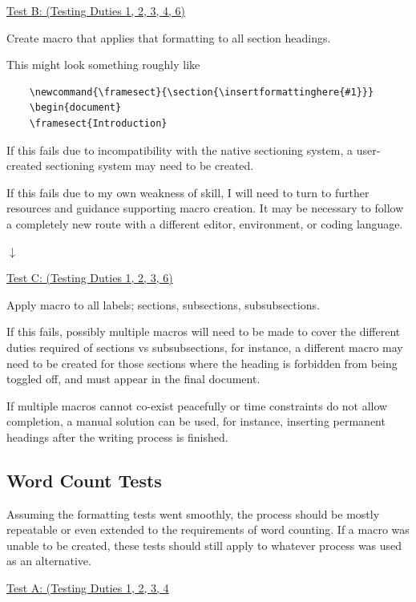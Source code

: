 \documentclass[12pt]{article}
\begin{document}
\underline{Test B: (Testing Duties 1, 2, 3, 4, 6)}

Create macro that applies that formatting to all section headings.

This might look something roughly like 
\begin{verbatim}
    \newcommand{\framesect}{\section{\insertformattinghere{#1}}}
    \begin{document}
    \framesect{Introduction}
\end{verbatim}

If this fails due to incompatibility with the native sectioning system, a user-created sectioning system may need to be created.

If this fails due to my own weakness of skill, I will need to turn to further resources and guidance supporting macro creation. It may be necessary to follow a completely new route with a different editor, environment, or coding language.

$\downarrow$

\underline{Test C: (Testing Duties 1, 2, 3, 6)}

Apply macro to all labels; sections, subsections, subsubsections.

If this fails, possibly multiple macros will need to be made to cover the different duties required of sections vs subsubsections, for instance, a different macro may need to be created for those sections where the heading is forbidden from being toggled off, and must appear in the final document.

If multiple macros cannot co-exist peacefully or time constraints do not allow completion, a manual solution can be used, for instance, inserting permanent headings after the writing process is finished.

\vspace{2em}
\subsection*{Word Count Tests}

Assuming the formatting tests went smoothly, the process should be mostly repeatable or even extended to the requirements of word counting. If a macro was unable to be created, these tests should still apply to whatever process was used as an alternative.

\underline{Test A: (Testing Duties 1, 2, 3, 4}
\end{document}
